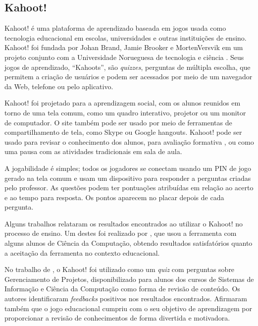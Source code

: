 \subsection{Kahoot!} \label{sec:Kahoot!}
Kahoot! é uma plataforma de aprendizado baseada em jogos usada como tecnologia educacional em escolas, universidades e outras instituições de ensino. Kahoot! foi fundada por Johan Brand, Jamie Brooker e MortenVersvik em um projeto conjunto com a Universidade Norueguesa de tecnologia e ciência \cite{kahoot2018}. Seus jogos de aprendizado, ``Kahoots'', são \textit{quizzes}, perguntas de múltipla escolha, que permitem a criação de usuários e podem ser acessados por meio de um navegador da Web, telefone ou pelo aplicativo.

Kahoot! foi projetado para a aprendizagem social, com os alunos reunidos em torno de uma tela comum, como um quadro interativo, projetor ou um monitor de computador. O site também pode ser usado por meio de ferramentas de compartilhamento de tela, como Skype ou Google hangouts. Kahoot! pode ser usado para revisar o conhecimento dos alunos, para avaliação formativa \cite{kahootFormative}, ou como uma pausa com as atividades tradicionais em sala de aula. 

A jogabilidade é simples; todos os jogadores se conectam usando um PIN de jogo gerado na tela comum e usam um dispositivo para responder a perguntas criadas pelo professor. As questões podem ter pontuações atribuídas em relação ao acerto e ao tempo para resposta. Os pontos aparecem no placar depois de cada pergunta.

Alguns trabalhos relataram os resultados encontrados ao utilizar o Kahoot! no processo de ensino. Um destes foi realizado por , que usou a ferramenta com alguns alunos de Ciência da Computação, obtendo resultados satisfatórios quanto a aceitação da ferramenta no contexto educacional.

 
 No trabalho de , o Kahoot! foi utilizado como um \textit{quiz} com perguntas sobre Gerenciamento de Projetos, disponibilizado para alunos dos cursos de Sistemas de
Informação e Ciência da Computação como forma de revisão de conteúdo. Os autores identificaram \textit{feedbacks} positivos nos resultados encontrados. Afirmaram também que o jogo educacional cumpriu com o seu objetivo de aprendizagem por proporcionar a revisão de conhecimentos de forma divertida e motivadora.

